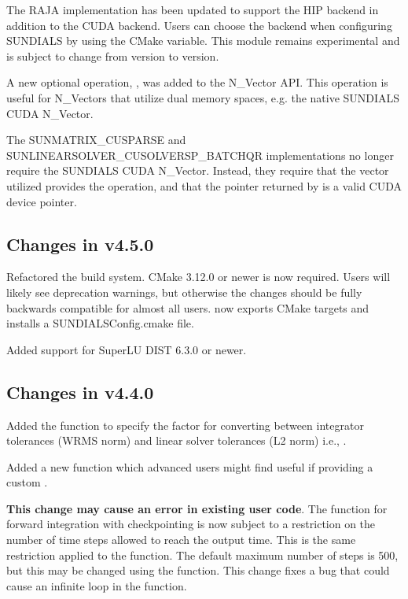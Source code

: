 The RAJA {\nvector} implementation has been updated to support the HIP backend
in addition to the CUDA backend. Users can choose the backend when configuring
SUNDIALS by using the  CMake variable. This module
remains experimental and is subject to change from version to version.

A new optional operation, , was added to the N\_Vector
API. This operation is useful for N\_Vectors that utilize dual memory spaces,
e.g. the native SUNDIALS CUDA N\_Vector.

The SUNMATRIX\_CUSPARSE and SUNLINEARSOLVER\_CUSOLVERSP\_BATCHQR implementations
no longer require the SUNDIALS CUDA N\_Vector. Instead, they require that the vector
utilized provides the  operation, and that the pointer
returned by  is a valid CUDA device pointer.

\subsection*{Changes in v4.5.0}

Refactored the {\sundials} build system. CMake 3.12.0 or newer is now required.
Users will likely see deprecation warnings, but otherwise the changes
should be fully backwards compatible for almost all users. {\sundials}
now exports CMake targets and installs a SUNDIALSConfig.cmake file.

Added support for SuperLU DIST 6.3.0 or newer.

\subsection*{Changes in v4.4.0}

Added the function  to specify the factor for
converting between integrator tolerances (WRMS norm) and linear solver
tolerances (L2 norm) i.e., .

Added a new function  which advanced users might
find useful if providing a custom .

\textbf{This change may cause an error in existing user code}.
The  function for forward integration with checkpointing is now
subject to a restriction on the number of time steps allowed to reach the output
time. This is the same restriction applied to the  function. The
default maximum number of steps is 500, but this may be changed using the
 function. This change fixes a bug that could cause an
infinite loop in the  function.


